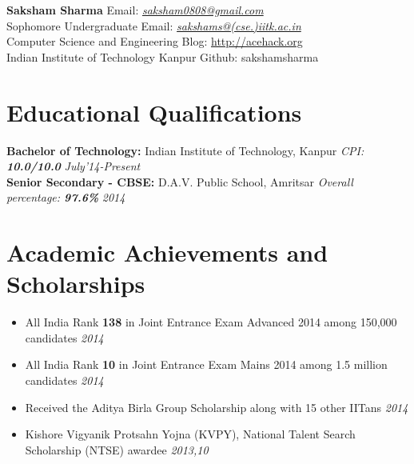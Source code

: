 \documentclass[11pt,a4paper]{article}
\begin{document}
\textbf{\huge{Saksham Sharma}} \hfill Email: \href{mailto:saksham0808@gmail.com}{\textit{saksham0808@gmail.com}}\\
Sophomore Undergraduate    \hfill  Email: \href{mailto:sakshams@cse.iitk.ac.in}{\textit{sakshams@(cse.)iitk.ac.in}}\\
Computer Science and Engineering      \hfill Blog: \url{http://acehack.org}\\
Indian Institute of Technology Kanpur \hfill Github: sakshamsharma

\vspace{-0.4cm}
\section*{Educational Qualifications}
\vspace{-0.2cm}
\textbf{\large{Bachelor of Technology:}} Indian Institute of Technology, Kanpur \emph{CPI: \textbf{10.0/10.0}} \hfill\textit{July'14-Present}\\
\textbf{\large{Senior Secondary - CBSE:}} D.A.V. Public School, Amritsar \emph{Overall percentage: \textbf{97.6\%}} \hfill\textit{2014}


\vspace{-0.5cm}
\section*{Academic Achievements and Scholarships}
\vspace{-0.2cm}
\begin{itemize}
\item All India Rank \textbf{138} in Joint Entrance Exam Advanced 2014 among 150,000 candidates            	\hfill \textit{2014}
\item All India Rank \textbf{10} in Joint Entrance Exam Mains 2014 among 1.5 million candidates              \hfill \textit{2014}
\item Received the Aditya Birla Group Scholarship along with 15 other IITans                        \hfill \textit{2014}
\item Kishore Vigyanik Protsahn Yojna (KVPY), National Talent Search Scholarship (NTSE) awardee
      \hfill \textit{2013,10}
\end{itemize}

\vspace{-0.6cm}
\end{document}
